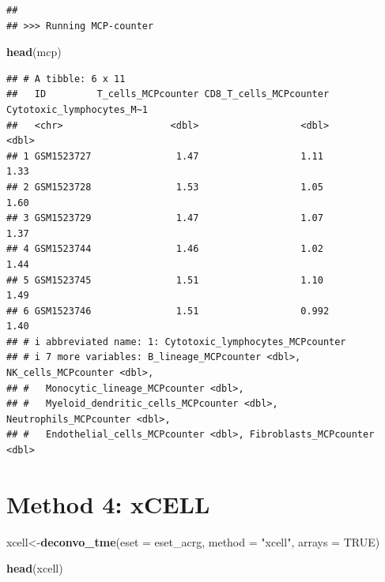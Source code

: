 \documentclass[
  12pt,
]{book}
\newenvironment{Shaded}{\begin{snugshade}}{\end{snugshade}}
\newcommand{\AttributeTok}[1]{\textcolor[rgb]{0.13,0.29,0.53}{#1}}
\newcommand{\ConstantTok}[1]{\textcolor[rgb]{0.56,0.35,0.01}{#1}}
\newcommand{\FunctionTok}[1]{\textcolor[rgb]{0.13,0.29,0.53}{\textbf{#1}}}
\newcommand{\NormalTok}[1]{#1}
\newcommand{\OtherTok}[1]{\textcolor[rgb]{0.56,0.35,0.01}{#1}}
\newcommand{\StringTok}[1]{\textcolor[rgb]{0.31,0.60,0.02}{#1}}
\theoremstyle{definition}
\theoremstyle{definition}
\theoremstyle{definition}
\theoremstyle{definition}
\theoremstyle{remark}
\begin{document}
\begin{verbatim}
## 
## >>> Running MCP-counter
\end{verbatim}

\begin{Shaded}
\begin{Highlighting}[]
\FunctionTok{head}\NormalTok{(mcp)}
\end{Highlighting}
\end{Shaded}

\begin{verbatim}
## # A tibble: 6 x 11
##   ID         T_cells_MCPcounter CD8_T_cells_MCPcounter Cytotoxic_lymphocytes_M~1
##   <chr>                   <dbl>                  <dbl>                     <dbl>
## 1 GSM1523727               1.47                  1.11                       1.33
## 2 GSM1523728               1.53                  1.05                       1.60
## 3 GSM1523729               1.47                  1.07                       1.37
## 4 GSM1523744               1.46                  1.02                       1.44
## 5 GSM1523745               1.51                  1.10                       1.49
## 6 GSM1523746               1.51                  0.992                      1.40
## # i abbreviated name: 1: Cytotoxic_lymphocytes_MCPcounter
## # i 7 more variables: B_lineage_MCPcounter <dbl>, NK_cells_MCPcounter <dbl>,
## #   Monocytic_lineage_MCPcounter <dbl>,
## #   Myeloid_dendritic_cells_MCPcounter <dbl>, Neutrophils_MCPcounter <dbl>,
## #   Endothelial_cells_MCPcounter <dbl>, Fibroblasts_MCPcounter <dbl>
\end{verbatim}

\hypertarget{method-4-xcell}{%
\section{Method 4: xCELL}\label{method-4-xcell}}

\begin{Shaded}
\begin{Highlighting}[]
\NormalTok{xcell}\OtherTok{\textless{}{-}}\FunctionTok{deconvo\_tme}\NormalTok{(}\AttributeTok{eset =}\NormalTok{ eset\_acrg, }\AttributeTok{method =} \StringTok{"xcell"}\NormalTok{, }\AttributeTok{arrays =} \ConstantTok{TRUE}\NormalTok{)}
\end{Highlighting}
\end{Shaded}

\begin{Shaded}
\begin{Highlighting}[]
\FunctionTok{head}\NormalTok{(xcell)}
\end{Highlighting}
\end{Shaded}
\end{document}

